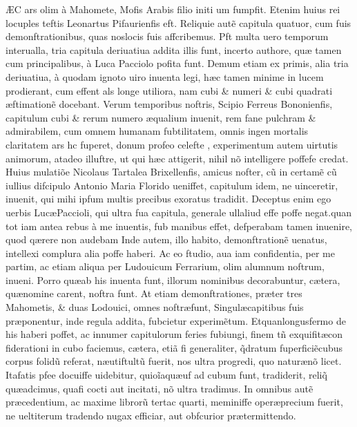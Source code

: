 \lettrine[lines=6,nindent=0pt,findent=5pt,lraise=-0.15,depth=1]{\color{VioletRed4}}{{\AE}C} ars olim à Mahomete, Mofis Arabis filio initi um fumpfit. Etenim huius rei locuples teftis Leonartus Pifaurienfis eft. Reliquie aut\~{e} capitula quatuor, cum fuis demonftrationibus, quas noslocis fuis affcribemus. Pft multa uero temporum interualla, tria capitula deriuatiua addita illis funt, incerto authore, qu{\ae} tamen cum principalibus, à Luca Pacciolo pofita funt. Demum etiam ex primis, alia tria deriuatiua, à quodam ignoto uiro inuenta legi, h{\ae}c tamen minime in lucem prodierant, cum effent al{\nb}s longe utiliora, nam cubi \& numeri \& cubi quadrati {\ae}ftimation\~{e} docebant. Verum temporibus noftris, Scipio Ferreus Bononienfis, capitulum cubi \& rerum numero {\ae}qualium inuenit, rem fane pulchram \& admirabilem, cum omnem humanam fubtilitatem, omnis ingen{\nb} mortalis claritatem ars h{\ee}c fuperet, donum profe{\ct}o celefte , experimentum autem uirtutis animorum, at{\que}adeo illuftre, ut qui h{\ae}c attigerit, nihil nõ intelligere poffefe credat. Huius {\ee}mulatiõe Nicolaus Tartalea Brixellenfis, amicus nofter, c\~{u} in certam\~{e} c\~{u} iullius difcipulo Antonio Maria Florido ueniffet, capitulum idem, ne uinceretir, inuenit, qui mihi ipfum multis precibus exoratus tradidit. Deceptus enim ego uerbis Luc\ae Paccioli, qui ultra fua capitula, generale ull\utraco aliud effe poffe negat.quan{\que} tot iam antea rebus à me inuentis, fub manibus effet, defperabam tamen inuenire, quod q{\ae}rere non audebam Inde autem, illo habito, demonftration\~{e} uenatus, intellexi complura alia poffe haberi. Ac eo ftudio, au{\ct}a{\que} iam confidentia, per me partim, ac etiam aliqua per Ludouicum Ferrarium, olim alumnum noftrum, inueni. Porro qu\ae ab his inuenta funt, illorum nominibus decorabuntur, c{\ae}tera, qu\ae nomine carent, noftra funt. At etiam demonftrationes, pr{\ae}ter tres Mahometis, \& duas Lodouici, omnes noftr\ae funt, Singul{\ae}\que capitibus fuis pr{\ae}ponentur, inde regula addita, fub{\nb}cietur experim\~{e}tum. Etquan{\que}longusfermo de his haberi poffet, ac innumer capitulorum feries fubiungi, finem t\~{n} exquifit\ae con fiderationi in cubo faciemus, c{\ae}tera, eti\~{a} fi generaliter, \~{q}dratum fuperfici\~{e}cubus corpus folid\~{u} referat, n\ae uti\que ftult\~{u} fuerit, nos ultra progredi, quo natur\ae n\~{o} licet. Ita\que fatis pfe{\ct}e docuiffe uidebitur, quio\~{i}aqu\ae uf{\que} ad cubum funt, tradiderit, reli\~{q} qu\ae ad{\nb}cimus, quafi cocti aut incitati, n\~{o} ultra tradimus. In omnibus aut\~{e} pr{\ae}cedentium, ac maxime libror\~{u} tert\nb ac quarti, meminiffe oper{\ae}precium fuerit, ne ueltiterum tradendo nugax efficiar, aut obfcurior pr{\ae}termittendo.

